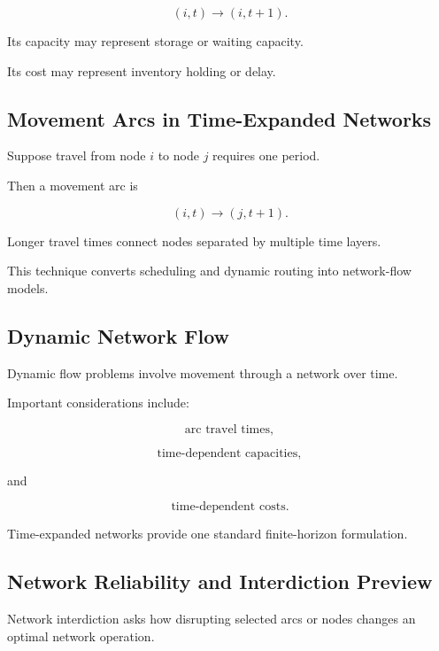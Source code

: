 \[
\boxed{
(i,t)
\to
(i,t+1).
}
\]

Its capacity may represent storage or waiting capacity.

Its cost may represent inventory holding or delay.

\subsection{Movement Arcs in Time-Expanded Networks}
\label{subsec:time-expanded-movement-arcs}

Suppose travel from node \(i\) to node \(j\) requires one period.

Then a movement arc is

\[
\boxed{
(i,t)
\to
(j,t+1).
}
\]

Longer travel times connect nodes separated by multiple time layers.

This technique converts scheduling and dynamic routing into network-flow
models.

\subsection{Dynamic Network Flow}
\label{subsec:dynamic-network-flow}

Dynamic flow problems involve movement through a network over time.

Important considerations include:

\[
\boxed{
\text{arc travel times},
}
\]

\[
\boxed{
\text{time-dependent capacities},
}
\]

and

\[
\boxed{
\text{time-dependent costs}.
}
\]

Time-expanded networks provide one standard finite-horizon formulation.

\subsection{Network Reliability and Interdiction Preview}
\label{subsec:network-interdiction}

Network interdiction asks how disrupting selected arcs or nodes changes an
optimal network operation.

